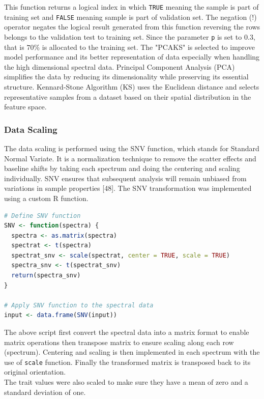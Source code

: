 \documentclass[12pt,a4paper]{report}
\begin{document}
This function returns a logical index in which \texttt{TRUE} meaning the sample is part of training set and \texttt{FALSE} meaning sample is part of validation set. The negation (!) operator negates the logical result generated from this function reversing the rows belongs to the validation test to training set. Since the parameter \texttt{p} is set to $0.3$, that is $70\%$ is allocated to the training set. The "PCAKS" is selected to improve model performance and its better representation of data especially when handling the high dimensional spectral data. Principal Component Analysis (PCA) simplifies the data by reducing its dimensionality while preserving its essential structure. Kennard-Stone Algorithm (KS) uses the Euclidean distance and selects representative samples from a dataset based on their spatial distribution in the feature space.


\subsubsection*{Data Scaling}
The data scaling is performed using the SNV function, which stands for Standard Normal Variate. It is a normalization technique to remove the scatter effects and baseline shifts by taking each spectrum and doing the centering and scaling individually. SNV ensures that subsequent analysis will remain unbiased from variations in sample properties [48]. The SNV transformation was implemented using a custom R function. \\

\begin{lstlisting}[language=R, style=mystyle]
# Define SNV function
SNV <- function(spectra) {
  spectra <- as.matrix(spectra)
  spectrat <- t(spectra)
  spectrat_snv <- scale(spectrat, center = TRUE, scale = TRUE)
  spectra_snv <- t(spectrat_snv)
  return(spectra_snv)
}

# Apply SNV function to the spectral data
input <- data.frame(SNV(input))
\end{lstlisting}

The above script first convert the spectral data into a matrix format to enable matrix operations then transpose matrix to ensure scaling along each row (spectrum). Centering and scaling is then implemented in each spectrum with the use of \texttt{scale} function. Finally the transformed matrix is transposed back to its original orientation. \\

The trait values were also scaled to make sure they have a mean of zero and a standard deviation of one. \\
\end{document}
